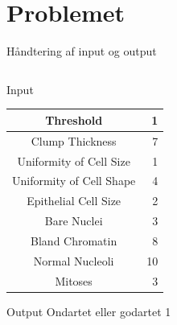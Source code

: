 \documentclass[12pt,t]{beamer}
\begin{document}
\section{Problemet}
\frame{\tableofcontents[currentsection]}
    \begin{frame}[c]{Håndtering af input og output}
        \begin{columns}
            \begin{column}{0.6\textwidth}
                \begin{block}{Input}
                    \begin{center}
                        \begin{tabular}{| c | r |}
                            \hline
                            Threshold                & 1           \\ \hline
                            Clump Thickness          & 7           \\ \hline
                            Uniformity of Cell Size  & 1           \\ \hline
                            Uniformity of Cell Shape & 4           \\ \hline
                            Epithelial Cell Size     & 2           \\ \hline
                            Bare Nuclei              & 3           \\ \hline
                            Bland Chromatin          & 8           \\ \hline
                            Normal Nucleoli          & 10          \\ \hline
                            Mitoses                  & 3           \\ \hline
                        \end{tabular}
                    \end{center}
                \end{block}
                \vspace{-1em}
                \begin{block}{Output}
                    \centering Ondartet eller godartet
                    {\color{KUNATgreen}1}
                \end{block}
            \end{column}
            \pause


\end{columns}
\end{frame}
\end{document}

